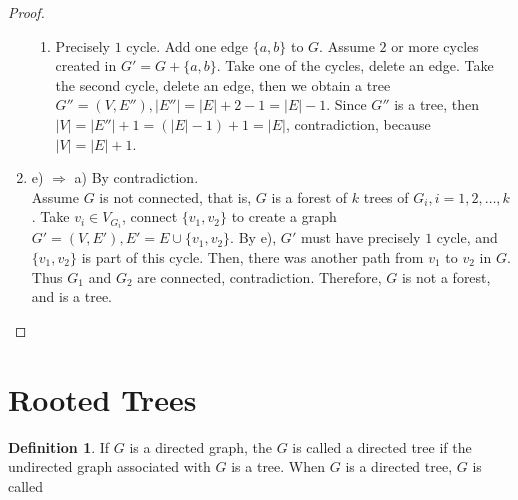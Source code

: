 \documentclass[letter]{book}
\theoremstyle{definition}
\theoremstyle{definition}
\newtheorem{mydef}{Definition}[chapter]
\theoremstyle{remark}
\begin{document}
\begin{proof}
\begin{enumerate}
\begin{enumerate}
                \item Precisely $1$ cycle. Add one edge $\{a,b\}$ to $G$. Assume $2$ or more cycles created in $G'=G+\{a,b\}$. Take one of the cycles, delete an edge. Take the second cycle, delete an edge, then we obtain a tree $G''=(V,E''), |E''|=|E|+2-1=|E|-1$. Since $G''$ is a tree, then $|V|=|E''|+1=(|E|-1)+1=|E|$, contradiction, because $|V|=|E|+1$.
            \end{enumerate}
        \item e) $\Rightarrow$ a) By contradiction.\\
            Assume $G$ is not connected, that is, $G$ is a forest of $k$ trees of $G_i,i=1,2,\ldots, k$. Take $v_i\in V_{G_i}$, connect $\{v_1,v_2\}$ to create a graph $G'=(V,E'),E'=E\cup \{v_1,v_2\}$. By e), $G'$ must have precisely $1$ cycle, and $\{v_1,v_2\}$ is part of this cycle. Then, there was another path from $v_1$ to $v_2$ in $G$. Thus $G_1$ and $G_2$ are connected, contradiction. Therefore, $G$ is not a forest, and is a tree.
    \end{enumerate}
\end{proof}
\section{Rooted Trees}
\begin{mydef}
    If $G$ is a directed graph, the $G$ is called a directed tree if the undirected graph associated with $G$ is a tree. When $G$ is a directed tree, $G$ is called 
\end{mydef}
\end{document}
